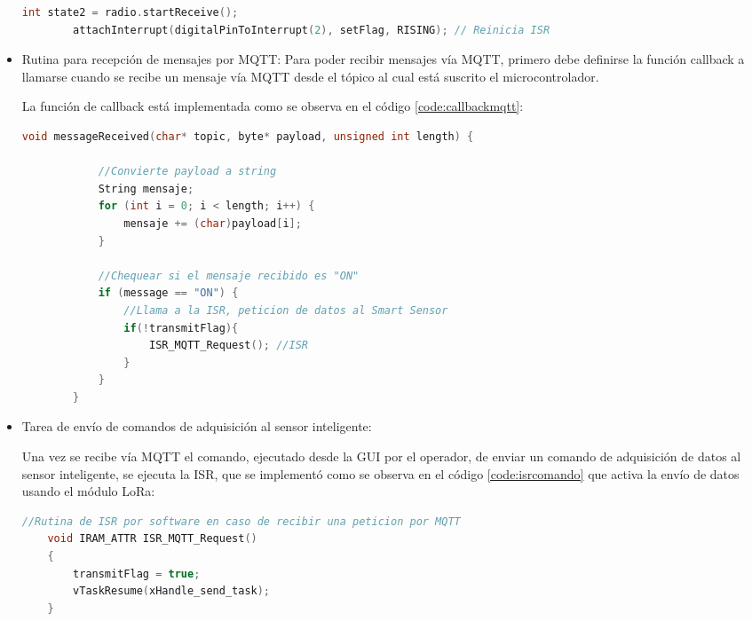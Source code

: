 \begin{itemize}
    \begin{lstlisting}[language=C++, caption=Configuración del módulo LoRa para escuchar paquetes, label=code:loralisten]
        int state2 = radio.startReceive();
        attachInterrupt(digitalPinToInterrupt(2), setFlag, RISING); // Reinicia ISR
    \end{lstlisting}
    
    \item Rutina para recepción de mensajes por MQTT: Para poder recibir mensajes vía MQTT, primero debe definirse la función callback a llamarse cuando se recibe un mensaje vía MQTT desde el tópico al cual está suscrito el microcontrolador.
    
    La función de callback está implementada como se observa en el código \ref{code:callbackmqtt}:

    \begin{lstlisting}[language=C++, caption=Función de callback para recepción de mensajes MQTT, label=code:callbackmqtt]
        void messageReceived(char* topic, byte* payload, unsigned int length) {

            //Convierte payload a string
            String mensaje;
            for (int i = 0; i < length; i++) {
                mensaje += (char)payload[i];
            }

            //Chequear si el mensaje recibido es "ON"
            if (message == "ON") {
                //Llama a la ISR, peticion de datos al Smart Sensor
                if(!transmitFlag){
                    ISR_MQTT_Request(); //ISR
                }
            }
        }
    \end{lstlisting}
    
    \item Tarea de envío de comandos de adquisición al sensor inteligente:
    
    Una vez se recibe vía MQTT el comando, ejecutado desde la GUI por el operador, de enviar un comando de adquisición de datos al sensor inteligente, se ejecuta la ISR, que se implementó como se observa en el código \ref{code:isrcomando} que activa la envío de datos usando el módulo LoRa:

    \begin{lstlisting}[language=C++, caption=ISR de activación de envío de comando por LoRa, label=code:isrcomando]
    //Rutina de ISR por software en caso de recibir una peticion por MQTT
    void IRAM_ATTR ISR_MQTT_Request()
    {
        transmitFlag = true;
        vTaskResume(xHandle_send_task);
    }
    \end{lstlisting}


\end{itemize}
